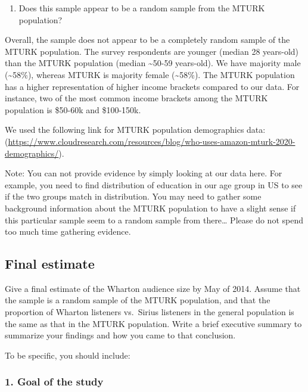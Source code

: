 \documentclass[
]{article}
\providecommand{\tightlist}{%
  \setlength{\itemsep}{0pt}\setlength{\parskip}{0pt}}
\begin{document}
\begin{enumerate}
\def\labelenumi{\arabic{enumi}.}
\setcounter{enumi}{1}
\tightlist
\item
  Does this sample appear to be a random sample from the MTURK
  population?
\end{enumerate}

Overall, the sample does not appear to be a completely random sample of
the MTURK population. The survey respondents are younger (median 28
years-old) than the MTURK population (median \textasciitilde50-59
years-old). We have majority male (\textasciitilde58\%), whereas MTURK
is majority female (\textasciitilde58\%). The MTURK population has a
higher representation of higher income brackets compared to our data.
For instance, two of the most common income brackets among the MTURK
population is \$50-60k and \$100-150k.

We used the following link for MTURK population demographics data:
(\url{https://www.cloudresearch.com/resources/blog/who-uses-amazon-mturk-2020-demographics/}).

Note: You can not provide evidence by simply looking at our data here.
For example, you need to find distribution of education in our age group
in US to see if the two groups match in distribution. You may need to
gather some background information about the MTURK population to have a
slight sense if this particular sample seem to a random sample from
there\ldots{} Please do not spend too much time gathering evidence.

\hypertarget{final-estimate}{%
\subsection{Final estimate}\label{final-estimate}}

Give a final estimate of the Wharton audience size by May of 2014.
Assume that the sample is a random sample of the MTURK population, and
that the proportion of Wharton listeners vs.~Sirius listeners in the
general population is the same as that in the MTURK population. Write a
brief executive summary to summarize your findings and how you came to
that conclusion.

To be specific, you should include:

\hypertarget{goal-of-the-study}{%
\subsubsection{1. Goal of the study}\label{goal-of-the-study}}
\end{document}
